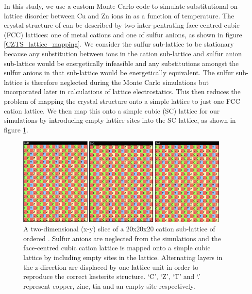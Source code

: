 In this study, we use a custom Monte Carlo code to simulate substitutional on-lattice disorder between Cu and Zn ions in {\CZTS } as a function of temperature. The crystal structure of {\CZTS } can be described by two inter-pentrating face-centred cubic (FCC) lattices: one of metal cations and one of sulfur anions, as shown in figure \ref{CZTS_lattice_mapping}. We consider the sulfur sub-lattice to be stationary because any substitution between ions in the cation sub-lattice and sulfur anion sub-lattice would be energetically infeasible and any substitutions amongst the sulfur anions in that sub-lattice would be energetically equivalent. The sulfur sub-lattice is therefore neglected during the Monte Carlo simulations but incorporated later in calculations of lattice electrostatics. This then reduces the problem of mapping the {\CZTS } crystal structure onto a simple lattice to just one FCC cation lattice. We then map this onto a simple cubic (SC) lattice for our simulations by introducing empty lattice sites into the SC lattice, as shown in figure \ref{eris_config_eg}. \\

\begin{figure}[h!]
  \centering
    \includegraphics[width=0.95\textwidth]{figures/eris_config_eg.png}
    \caption{A two-dimensional (x-y) slice of a 20x20x20 cation sub-lattice of ordered { \CZTS }. Sulfur anions are neglected from the simulations and the face-centred cubic cation lattice is mapped onto a simple cubic lattice by including empty sites in the lattice. Alternating layers in the z-direction are displaced by one lattice unit in order to reproduce the correct kesterite structure. `C', `Z', `T' and `.' represent copper, zinc, tin and an empty site respectively.}
  \label{eris_config_eg}
\end{figure}

